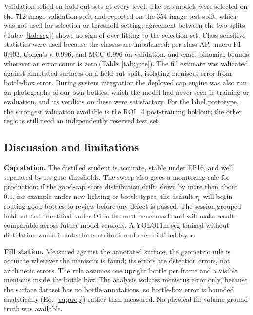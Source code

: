 Validation relied on hold-out sets at every level. The cap models were selected on the 712-image validation split and reported on the 354-image test split, which was not used for selection or threshold setting; agreement between the two splits (Table~\ref{tab:seg}) shows no sign of over-fitting to the selection set. Class-sensitive statistics were used because the classes are imbalanced: per-class AP, macro-F1 0.993, Cohen's $\kappa$ 0.996, and MCC 0.996 on validation, and exact binomial bounds wherever an error count is zero (Table~\ref{tab:gate}). The fill estimate was validated against annotated surfaces on a held-out split, isolating meniscus error from bottle-box error. During system integration the deployed cap engine was also run on photographs of our own bottles, which the model had never seen in training or evaluation, and its verdicts on these were satisfactory. For the label prototype, the strongest validation available is the ROI\_4 post-training holdout; the other regions still need an independently reserved test set.

\subsection{Discussion and limitations}
\label{sec:discussion}

\noindent\textbf{Cap station.} The distilled student is accurate, stable under FP16, and well separated by its gate thresholds. The sweep also gives a monitoring rule for production: if the good-cap score distribution drifts down by more than about 0.1, for example under new lighting or bottle types, the default $\tau_p$ will begin routing good bottles to review before any defect is passed. The session-grouped held-out test identified under O1 is the next benchmark and will make results comparable across future model versions. A YOLO11m-seg trained without distillation would isolate the contribution of each distilled layer.

\noindent\textbf{Fill station.} Measured against the annotated surface, the geometric rule is accurate wherever the meniscus is found; its errors are detection errors, not arithmetic errors. The rule assumes one upright bottle per frame and a visible meniscus inside the bottle box. The analysis isolates meniscus error only, because the surface dataset has no bottle annotations, so bottle-box error is bounded analytically (Eq.~\eqref{eq:prop}) rather than measured. No physical fill-volume ground truth was available.

